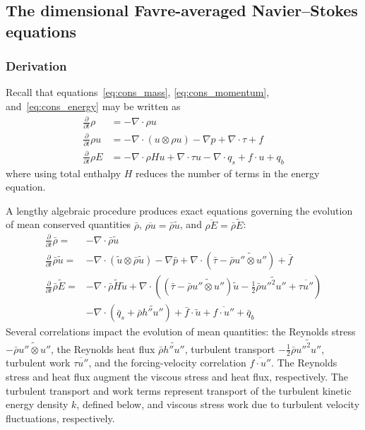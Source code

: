 \documentclass[letterpaper,11pt,nointlimits,reqno,draft]{amsart}
\begin{document}
\subsection{The dimensional Favre-averaged Navier--Stokes equations}

\subsubsection{Derivation}

Recall that equations~\eqref{eq:cons_mass}, \eqref{eq:cons_momentum},
and~\eqref{eq:cons_energy} may be written as
\begin{align}
    \frac{\partial}{\partial{}t}\rho
&=
  - \nabla\cdot\rho{}u
\\
    \frac{\partial{}}{\partial{}t}\rho{}u
&=
  - \nabla\cdot(u\otimes{}\rho{}u)
  - \nabla{}p + \nabla\cdot{}\tau + f
\\
    \frac{\partial}{\partial{}t} \rho{}E
&=
  - \nabla\cdot{}\rho{}Hu
  + \nabla\cdot{}\tau{}u
  - \nabla\cdot{}q_{s}
  + f\cdot{}u
  + q_b
\end{align}
where using total enthalpy $H$ reduces the number of terms in the energy
equation.

A lengthy algebraic procedure \citep[\textsection{}2]{OliverFANSModels2011}
produces exact equations governing the evolution of mean conserved quantities
$\bar{\rho}$, $\overline{\rho{}u}= \bar{\rho}\tilde{u}$, and
$\overline{\rho{}E} = \bar{\rho}\tilde{E}$:
\begin{subequations}\label{eq:unclosedfansequations}
\begin{align}
    \frac{\partial}{\partial{}t}\bar{\rho}
 =
 &- \nabla\cdot\bar{\rho}\tilde{u}
\\
    \frac{\partial{}}{\partial{}t}\bar{\rho}\tilde{u}
 =
 &- \nabla\cdot(\tilde{u}\otimes\bar{\rho}\tilde{u})
  - \nabla{}\bar{p}
  + \nabla\cdot\left(
        \bar{\tau}
      - \bar{\rho}\widetilde{u''\otimes{}u''}
    \right)
  + \bar{f}
\\
  \frac{\partial}{\partial{}t} \bar{\rho}\tilde{E}
 =
 &- \nabla\cdot{}\bar{\rho}\tilde{H}\tilde{u}
  + \nabla\cdot\left(
        \left(
            \bar{\tau}
          - \bar{\rho} \widetilde{u''\otimes{}u''}
        \right) \tilde{u}
      - \frac{1}{2}\bar{\rho}\widetilde{{u''}^{2}u''}
      + \overline{\tau{}u''}
    \right)
\\
 &- \nabla\cdot\left(
        \bar{q}_s
      + \bar{\rho} \widetilde{h''u''}
    \right)
  + \bar{f}\cdot\tilde{u}
  + \overline{f\cdot{}u''}
  + \bar{q}_{b}
\end{align}
\end{subequations}
Several correlations impact the evolution of mean quantities: the Reynolds
stress $-\bar{\rho}\widetilde{u''\otimes{}u''}$, the Reynolds heat flux
$\bar{\rho} \widetilde{h''u''}$, turbulent transport
$-\frac{1}{2}\bar{\rho}\widetilde{{u''}^{2}u''}$, turbulent work
$\overline{\tau{}u''}$, and the forcing-velocity correlation
$\overline{f\cdot{}u''}$.  The Reynolds stress and heat flux augment the
viscous stress and heat flux, respectively.  The turbulent transport and work
terms represent transport of the turbulent kinetic energy density $k$, defined
below, and viscous stress work due to turbulent velocity fluctuations,
respectively.
\end{document}
